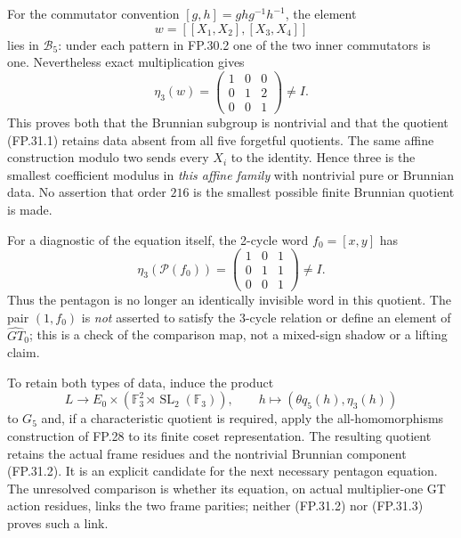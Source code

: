 For the commutator convention $[g,h]=ghg^{-1}h^{-1}$, the element
\[
 w=[[X_1,X_2],[X_3,X_4]]
\]
lies in $\mathcal B_5$: under each pattern in FP.30.2 one of the two
inner commutators is one. Nevertheless exact multiplication gives
\[
 \eta_3(w)=
 \begin{pmatrix}1&0&0\\0&1&2\\0&0&1\end{pmatrix}\ne I.
 \tag{FP.31.2}
\]
This proves both that the Brunnian subgroup is nontrivial and that
the quotient (FP.31.1) retains data absent from all five forgetful
quotients. The same affine construction modulo two sends every
$X_i$ to the identity. Hence three is the smallest coefficient
modulus in \emph{this affine family} with nontrivial pure or Brunnian
data. No assertion that order $216$ is the smallest possible finite
Brunnian quotient is made.

For a diagnostic of the equation itself, the 2-cycle word
$f_0=[x,y]$ has
\[
 \eta_3(\mathcal P(f_0))=
 \begin{pmatrix}1&0&1\\0&1&1\\0&0&1\end{pmatrix}\ne I.
 \tag{FP.31.3}
\]
Thus the pentagon is no longer an identically invisible word in this
quotient. The pair $(1,f_0)$ is \emph{not} asserted to satisfy the
3-cycle relation or define an element of $\widehat{GT}_0$; this is
a check of the comparison map, not a mixed-sign shadow or a lifting
claim.

To retain both types of data, induce the product
\[
 L\longrightarrow E_0\times
          (\mathbb F_3^2\rtimes\operatorname{SL}_2(\mathbb F_3)),
 \qquad h\longmapsto(\theta q_5(h),\eta_3(h))
\]
to $G_5$ and, if a characteristic quotient is required, apply the
all-homomorphisms construction of FP.28 to its finite coset
representation. The resulting quotient retains the actual frame
residues and the nontrivial Brunnian component (FP.31.2).
It is an explicit candidate for the next necessary pentagon equation.
The unresolved comparison is whether its equation, on actual
multiplier-one GT action residues, links the two frame parities;
neither (FP.31.2) nor (FP.31.3) proves such a link.

